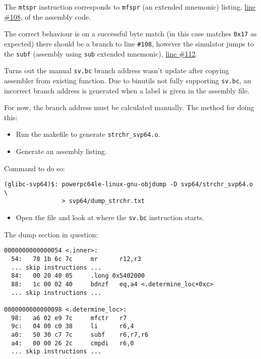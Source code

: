 The \texttt{mtspr} instruction corresponds to \texttt{mfspr}
(an extended mnemonic) listing,
\href{https://git.vantosh.com/ngisearch/glibc-svp64/src/commit/9378006a84bdef6af85eb0f810fb62fedc62c588/svp64-port/svp64/strchr_svp64.s#L108}{line \#108},
of the assembly code.

The correct behaviour is on a successful byte match (in this case
matches \texttt{0x17} as expected) there should be a branch to line
\texttt{\#108}, however the simulator jumps to the \texttt{subf}
(assembly using \texttt{sub} extended mnemonic),
\href{https://git.vantosh.com/ngisearch/glibc-svp64/src/commit/9378006a84bdef6af85eb0f810fb62fedc62c588/svp64-port/svp64/strchr_svp64.s#L112}{line \#112}.

Turns out the manual \texttt{sv.bc} branch address wasn't update after
copying assembler from existing function.
Due to binutils not fully supporting \texttt{sv.bc}, an incorrect
branch address is generated when a label is given in the assembly file.

For now, the branch address must be calculated manually.
The method for doing this:

\begin{itemize}
  \item Run the makefile to generate \texttt{strchr\_svp64.o}.
  \item Generate an assembly listing.
\end{itemize}

Command to do so:

\begin{verbatim}
(glibc-svp64)$: powerpc64le-linux-gnu-objdump -D svp64/strchr_svp64.o \
                > svp64/dump_strchr.txt
\end{verbatim}


\begin{itemize}
  \item Open the file and look at where the \texttt{sv.bc} instruction starts.
\end{itemize}

The dump section in question:

\begin{verbatim}
0000000000000054 <.inner>:
  54:   78 1b 6c 7c     mr      r12,r3
  ... skip instructions ...
  84:   00 20 40 05     .long 0x5402000
  88:   1c 00 02 40     bdnzf   eq,a4 <.determine_loc+0xc>
  ... skip instructions ...

0000000000000098 <.determine_loc>:
  98:   a6 02 e9 7c     mfctr   r7
  9c:   04 00 c0 38     li      r6,4
  a0:   50 30 c7 7c     subf    r6,r7,r6
  a4:   00 00 26 2c     cmpdi   r6,0
  ... skip instructions ...
\end{verbatim}

